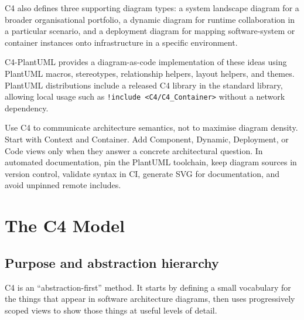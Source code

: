 \documentclass[11pt]{article}
\newcommand{\code}[1]{\texttt{#1}}
\begin{document}
C4 also defines three supporting diagram types: a system landscape diagram for a broader organisational portfolio, a dynamic diagram for runtime collaboration in a particular scenario, and a deployment diagram for mapping software-system or container instances onto infrastructure in a specific environment.\cite{c4diagrams,c4landscape,c4dynamic,c4deployment}

C4-PlantUML provides a diagram-as-code implementation of these ideas using PlantUML macros, stereotypes, relationship helpers, layout helpers, and themes. PlantUML distributions include a released C4 library in the standard library, allowing local usage such as \code{!include <C4/C4\_Container>} without a network dependency.\cite{c4plantuml,plantumlstdlib}

\begin{keybox}
Use C4 to communicate architecture semantics, not to maximise diagram density. Start with Context and Container. Add Component, Dynamic, Deployment, or Code views only when they answer a concrete architectural question. In automated documentation, pin the PlantUML toolchain, keep diagram sources in version control, validate syntax in CI, generate SVG for documentation, and avoid unpinned remote includes.
\end{keybox}

\section{The C4 Model}

\subsection{Purpose and abstraction hierarchy}

C4 is an ``abstraction-first'' method. It starts by defining a small vocabulary for the things that appear in software architecture diagrams, then uses progressively scoped views to show those things at useful levels of detail.\cite{c4abstractions}
\end{document}
